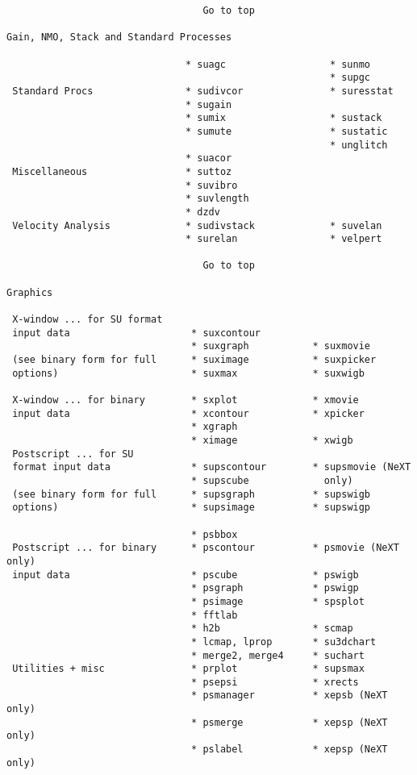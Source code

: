 {\begin{verbatim}
                                  Go to top

Gain, NMO, Stack and Standard Processes

                               * suagc                  * sunmo
                                                        * supgc
 Standard Procs                * sudivcor               * suresstat
                               * sugain
                               * sumix                  * sustack
                               * sumute                 * sustatic
                                                        * unglitch
                               * suacor
 Miscellaneous                 * suttoz
                               * suvibro
                               * suvlength
                               * dzdv
 Velocity Analysis             * sudivstack             * suvelan
                               * surelan                * velpert

                                  Go to top

Graphics

 X-window ... for SU format
 input data                     * suxcontour
                                * suxgraph           * suxmovie
 (see binary form for full      * suximage           * suxpicker
 options)                       * suxmax             * suxwigb

 X-window ... for binary        * sxplot             * xmovie
 input data                     * xcontour           * xpicker
                                * xgraph
                                * ximage             * xwigb
 Postscript ... for SU
 format input data              * supscontour        * supsmovie (NeXT
                                * supscube             only)
 (see binary form for full      * supsgraph          * supswigb
 options)                       * supsimage          * supswigp

                                * psbbox
 Postscript ... for binary      * pscontour          * psmovie (NeXT only)
 input data                     * pscube             * pswigb
                                * psgraph            * pswigp
                                * psimage            * spsplot
                                * fftlab
                                * h2b                * scmap
                                * lcmap, lprop       * su3dchart
                                * merge2, merge4     * suchart
 Utilities + misc               * prplot             * supsmax
                                * psepsi             * xrects
                                * psmanager          * xepsb (NeXT only)
                                * psmerge            * xepsp (NeXT only)
                                * pslabel            * xepsp (NeXT only)


\end{verbatim}}

